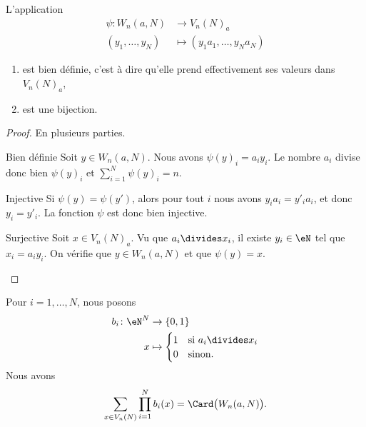 \begin{lemma}       \label{LEMooLKCAooCeDnSj}
    L'application
    \begin{equation}
        \begin{aligned}
            \psi\colon W_n(a,N)&\to V_n(N)_a \\
            (y_1,\ldots, y_N)&\mapsto (y_1a_1,\ldots, y_Na_N) 
        \end{aligned}
    \end{equation}
    \begin{enumerate}
        \item       
            est bien définie, c'est à dire qu'elle prend effectivement ses valeurs dans \( V_n(N)_a\),
        \item
            est une bijection.
    \end{enumerate}
\end{lemma}

\begin{proof}
    En plusieurs parties.
    \begin{subproof}
        \item[Bien définie]
            Soit \( y\in W_n(a,N)\). Nous avons \( \psi(y)_i=a_iy_i\). Le nombre \( a_i\) divise donc bien \( \psi(y)_i\) et \( \sum_{i=1}^N\psi(y)_i=n\).
        \item[Injective]
            Si \( \psi(y)=\psi(y')\), alors pour tout \( i\) nous avons \( y_ia_i=y'_ia_i\), et donc \( y_i=y'_i\). La fonction \( \psi\) est donc bien injective.
        \item[Surjective]
            Soit \( x\in V_n(N)_a\). Vu que \( a_i\divides x_i\), il existe \( y_i\in \eN\) tel que \( x_i=a_iy_i\). On vérifie que \( y\in W_n(a,N)\) et que \( \psi(y)=x\).
    \end{subproof}
\end{proof}


\begin{lemma}       \label{LEMooOPXHooHzoHrm}
    Pour \( i=1,\ldots, N\), nous posons
    \begin{equation}
        \begin{aligned}
            b_i\colon \eN^N&\to \{ 0,1 \} \\
            x&\mapsto \begin{cases}
                1    &   \text{si } a_i\divides x_i\\
                0    &    \text{sinon. }
            \end{cases}
        \end{aligned}
    \end{equation}
    Nous avons
    \begin{equation}
        \sum_{x\in V_n(N)}\prod_{i=1}^Nb_i(x)=\Card\big( W_n(a,N) \big).
    \end{equation}
\end{lemma}

